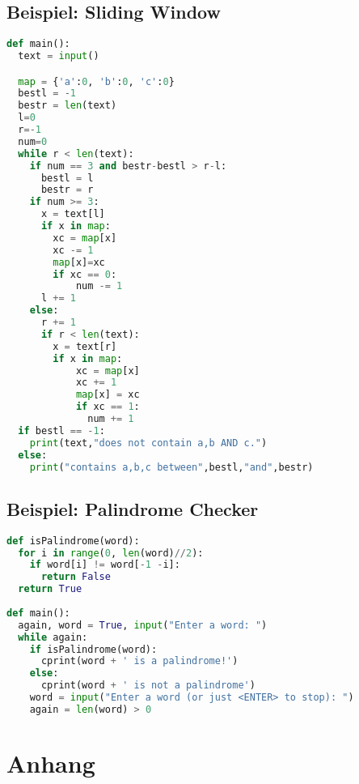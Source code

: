 \documentclass[german]{latex4ei/latex4ei_sheet}
\begin{document}
\begin{sectionbox}
\subsection{Beispiel: Sliding Window}
\begin{lstlisting}[language=Python]
def main():
  text = input()

  map = {'a':0, 'b':0, 'c':0}
  bestl = -1
  bestr = len(text)
  l=0
  r=-1
  num=0
  while r < len(text):
    if num == 3 and bestr-bestl > r-l:
      bestl = l
      bestr = r
    if num >= 3:
      x = text[l]
      if x in map:
        xc = map[x]
        xc -= 1
        map[x]=xc
        if xc == 0:
            num -= 1
      l += 1
    else:
      r += 1
      if r < len(text):
        x = text[r]
        if x in map:
            xc = map[x]
            xc += 1
            map[x] = xc
            if xc == 1:
              num += 1
  if bestl == -1:
    print(text,"does not contain a,b AND c.")
  else:
    print("contains a,b,c between",bestl,"and",bestr)
\end{lstlisting}
\end{sectionbox}

\begin{sectionbox}
\subsection{Beispiel: Palindrome Checker}
\begin{lstlisting}[language=Python]
def isPalindrome(word):
  for i in range(0, len(word)//2):
    if word[i] != word[-1 -i]:
      return False
  return True
    
def main():
  again, word = True, input("Enter a word: ")
  while again:
    if isPalindrome(word):
      cprint(word + ' is a palindrome!')
    else:
      cprint(word + ' is not a palindrome')
    word = input("Enter a word (or just <ENTER> to stop): ")
    again = len(word) > 0
\end{lstlisting}\vspace{-6px}
\end{sectionbox}

\vspace{300px}

\section{Anhang}
\end{document}
